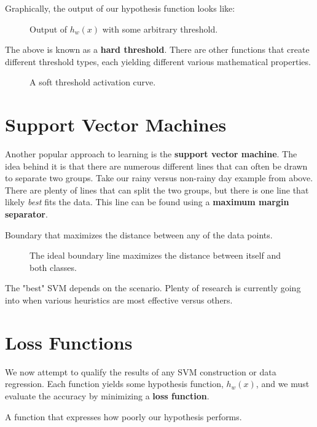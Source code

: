Graphically, the output of our hypothesis function looks like:
\begin{figure}[H]
	\centering
	\caption{Output of \(h_w(x)\) with some arbitrary threshold.}
	\label{fig:hypfuncout}
\end{figure}

The above is known as a \textbf{hard threshold}. There are other functions that create different threshold types, each yielding different various mathematical properties.

\begin{figure}[H]
	\centering
	\caption{A soft threshold activation curve.}
	\label{fig:soft}
\end{figure}

\section{Support Vector Machines}
Another popular approach to learning is the \textbf{support vector machine}. The idea behind it is that there are numerous different lines that can often be drawn to separate two groups. Take our rainy versus non-rainy day example from above. There are plenty of lines that can split the two groups, but there is one line that likely \emph{best} fits the data. This line can be found using a \textbf{maximum margin separator}.
\begin{definition}
	Boundary that maximizes the distance between any of the data points.
\end{definition}

\begin{figure}[H]
	\centering
	\caption{The ideal boundary line maximizes the distance between itself and both classes.}
	\label{fig:svm0}
\end{figure}

The "best" SVM depends on the scenario. Plenty of research is currently going into when various heuristics are most effective versus others.

\section{Loss Functions}
We now attempt to qualify the results of any SVM construction or data regression. Each function yields some hypothesis function, \(h_w(x)\), and we must evaluate the accuracy by minimizing a \textbf{loss function}.
\begin{definition}
	A function that expresses how poorly our hypothesis performs.
\end{definition}

